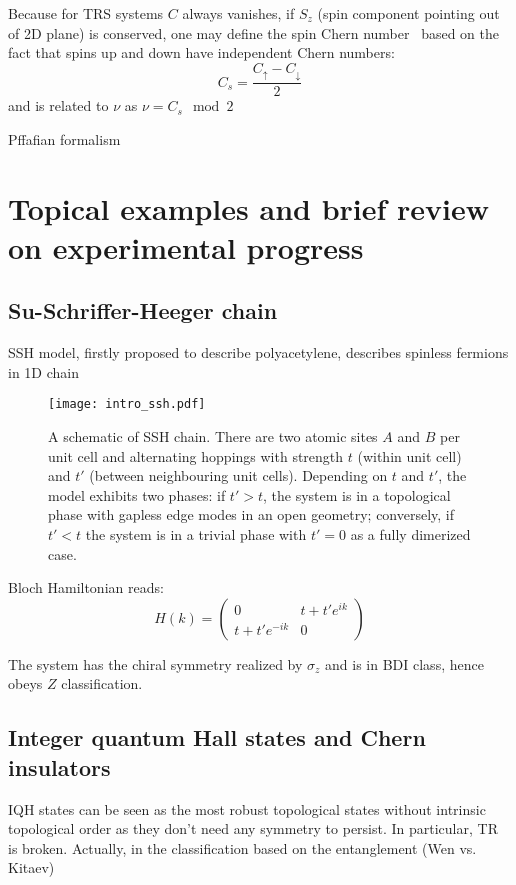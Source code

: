 {Because for TRS systems $C$ always vanishes, if $S_z$ (spin component pointing out of 2D plane) is conserved, one may define the spin Chern number~\cite{ShengCs2006} based on the fact that spins up and down have independent Chern numbers:
\begin{equation}
C_s = \frac{C_{\uparrow} - C_{\downarrow}}{2}
\label{eq:spinchern}
\end{equation}
and is related to $\nu$ as $\nu = C_s \mod 2$



Pffafian formalism 

\section{Topical examples and brief review on experimental progress}

\subsection{Su-Schriffer-Heeger chain}
SSH model, firstly proposed to describe polyacetylene, describes spinless fermions in 1D chain~\cite{SSH1976}

\begin{figure}[H]
\centering
\texttt{[image: intro\_ssh.pdf]}
\caption{A schematic of SSH chain. There are two atomic sites $A$ and $B$ per unit cell and alternating hoppings with strength $t$ (within unit cell) and $t'$ (between neighbouring unit cells). Depending on $t$ and $t'$,  the model exhibits two phases: if $t' > t$, the system is in a topological phase with gapless edge modes in an open geometry; conversely, if $t' < t$ the system is in a trivial phase with $t' = 0$ as a fully dimerized case.}
\label{fig:ssh}
\end{figure}

Bloch Hamiltonian reads:
\begin{equation}
H (k) = \begin{pmatrix}
0 & t + t' e^{i k} \\
t + t' e^{-i k} & 0
\end{pmatrix}
\label{eq:ssh}
\end{equation}

The system has the chiral symmetry realized by $\sigma_z$ and is in BDI class, hence obeys $Z$ classification.

\subsection{Integer quantum Hall states and Chern insulators}
IQH states can be seen as the most robust topological states without intrinsic topological order as they don't need any symmetry to persist. In particular, TR is broken. Actually, in the classification based on the entanglement (Wen vs. Kitaev)


}
